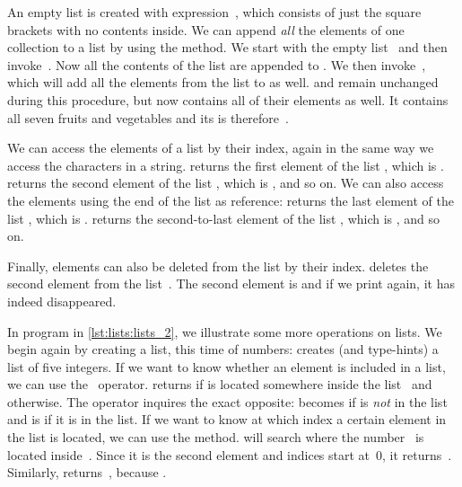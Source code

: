 An empty list is created with expression~\pythonilIdx{[]}, which consists of just the square brackets with no contents inside.
We can append \emph{all} the elements of one collection to a list by using the  method.
We start with the empty list~ and then invoke~.
Now all the contents of the list  are appended to .
We then invoke~, which will add all the elements from the list  to  as well.
 and  remain unchanged during this procedure, but  now contains all of their elements as well.
It contains all seven fruits and vegetables and its  is therefore~.

We can access the elements of a list by their index, again in the same way we access the characters in a string.
 returns the first element of the list , which is .
 returns the second element of the list , which is , and so on.
We can also access the elements using the end of the list as reference:
 returns the last element of the list , which is .
 returns the second-to-last element of the list , which is , and so on.

Finally, elements can also be deleted from the list by their index.
 deletes the second element from the list~.
The second element is  and if we print  again, it has indeed disappeared.

In program  in \cref{lst:lists:lists_2}, we illustrate some more operations on lists.
We begin again by creating a list, this time of numbers:  creates (and type-hints) a list of five integers.
If we want to know whether an element is included in a list, we can use the ~operator.
 returns  if  is located somewhere inside the list~ and  otherwise.
The  operator inquires the exact opposite:
 becomes  if  is \emph{not} in the list~ and is  if it is in the list.
If we want to know at which index a certain element in the list is located, we can use the  method.
 will search where the number~ is located inside~.
Since it is the second element and indices start at~0, it returns~.
Similarly,  returns~, because .

